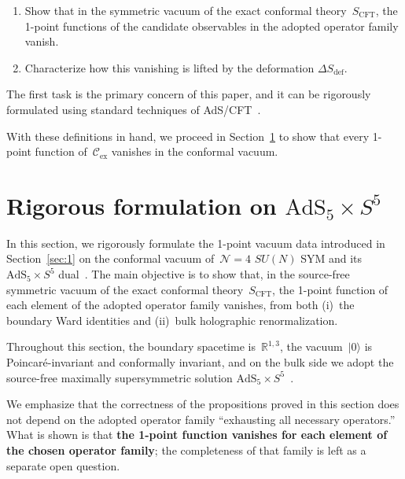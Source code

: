 \documentclass[
  aps,
  prd,
  preprint,
  groupedaddress,
  nofootinbib,
  longbibliography
]{revtex4-2}
\theoremstyle{remark}
\newcommand{\Cex}{\mathcal{C}_{\mathrm{ex}}}
\newcommand{\N}{\mathcal{N}}
\newcommand{\AdS}{\mathrm{AdS}}
\begin{document}
\begin{enumerate}
\item Show that in the symmetric vacuum of the exact conformal
  theory~$S_{\mathrm{CFT}}$, the 1-point functions of the
  candidate observables in the adopted operator family vanish.
\item Characterize how this vanishing is lifted by the
  deformation $\Delta S_{\mathrm{def}}$.
\end{enumerate}

The first task is the primary concern of this paper, and it
can be rigorously formulated using standard techniques of
AdS/CFT~\cite{ref2,ref3,ref9,ref10}.

With these definitions in hand, we proceed in
Section~\ref{sec:2} to show that every 1-point function
of~$\Cex$ vanishes in the conformal vacuum.

\section{Rigorous formulation on
  \texorpdfstring{$\AdS_5\times S^5$}{AdS5 x S5}}\label{sec:2}

In this section, we rigorously formulate the 1-point vacuum data
introduced in Section~\ref{sec:1} on the conformal vacuum
of~$\N=4$ $SU(N)$ SYM and its $\AdS_5\times S^5$
dual~\cite{ref2,ref3,ref5,ref9,ref10,ref11,ref12}.
The main objective is to show that, in the source-free symmetric
vacuum of the exact conformal theory~$S_{\mathrm{CFT}}$,
the 1-point function of each element of the adopted operator
family vanishes, from both (i)~the boundary Ward identities
and (ii)~bulk holographic renormalization.

Throughout this section, the boundary spacetime is~$\mathbb{R}^{1,3}$,
the vacuum~$|0\rangle$ is Poincar\'e-invariant and conformally
invariant, and on the bulk side we adopt the source-free maximally
supersymmetric solution $\AdS_5\times
S^5$~\cite{ref1,ref2,ref3,ref4}.

We emphasize that the correctness of the propositions proved in
this section does not depend on the adopted operator family
``exhausting all necessary operators.''
What is shown is that \textbf{the 1-point function vanishes for
each element of the chosen operator family}; the completeness
of that family is left as a separate open question.
\end{document}

